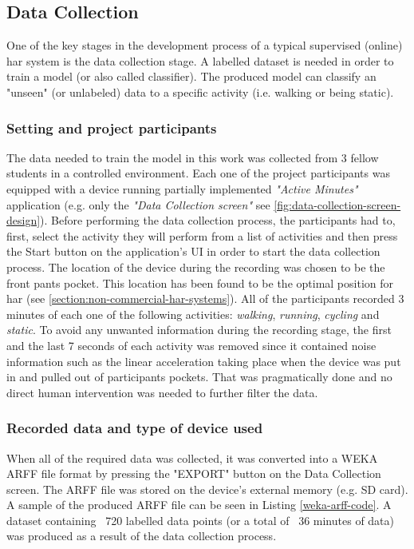     \subsection{Data Collection}
    One of the key stages in the development process of a typical supervised (online) \gls{har} system is the data collection stage. A labelled dataset is needed in order to train a model (or also called classifier). The produced model can classify an "unseen" (or unlabeled) data to a specific activity (i.e. walking or being static).
    
    \subsubsection*{Setting and project participants}
    The data needed to train the model in this work was collected from 3 fellow students in a controlled environment. Each one of the project participants was equipped with a device running partially implemented \textit{"Active Minutes"} application (e.g. only the \textit{"Data Collection screen"} see \ref{fig:data-collection-screen-design}). Before performing the data collection process, the participants had to, first, select the activity they will perform from a list of activities and then press the Start button on the application's UI in order to start the data collection process. The location of the device during the recording was chosen to be the front pants pocket. This location has been found to be the optimal position for \gls{har} (see \ref{section:non-commercial-har-systems}). All of the participants recorded 3 minutes of each one of the following activities: \textit{walking}, \textit{running}, \textit{cycling} and \textit{static}. To avoid any unwanted information during the recording stage, the first and the last 7 seconds of each activity was removed since it contained noise information such as the linear acceleration taking place when the device was put in and pulled out of participants pockets. That was pragmatically done and no direct human intervention was needed to further filter the data.
    
    \subsubsection*{Recorded data and type of device used}
    When all of the required data was collected, it was converted into a WEKA ARFF file format by pressing the "EXPORT" button on the Data Collection screen. The ARFF file was stored on the device's external memory (e.g. SD card). A sample of the produced ARFF file can be seen in Listing \ref{weka-arff-code}. A dataset containing ~720 labelled data points (or a total of ~36 minutes of data) was produced as a result of the data collection process. 
    

